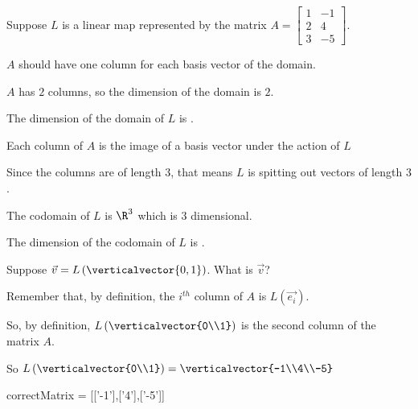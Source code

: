 \documentclass{ximera}
\begin{document}
\begin{question}
  Suppose $L$ is a linear map represented by the matrix
  $A = \begin{bmatrix}
    1&-1\\2&4\\3&-5
  \end{bmatrix}.$
  
  \begin{solution}
  \begin{hint}
  	$A$ should have one column for each basis vector of the domain.
  \end{hint}
  \begin{hint}
  	$A$ has $2$ columns, so the dimension of the domain is $2$.
  \end{hint}
  The dimension of the domain of $L$ is .
  \end{solution}

  \begin{solution}
  	\begin{hint}
  		Each column of $A$ is the image of a basis vector under the action of $L$
  	\end{hint}
  	\begin{hint}
  		Since the columns are of length $3$, that means $L$ is spitting out vectors of length $3$.
  	\end{hint}
  	\begin{hint}
  		The codomain of $L$ is $\R^3$ which is $3$ dimensional.
  	\end{hint}
    The dimension of the codomain of $L$ is .
  \end{solution}
  
  Suppose $\vec{v} = L\left(\verticalvector{0,1}\right)$.  What is $\vec{v}$?
    
  \begin{solution}
  	\begin{hint}
  		Remember that, by definition, the $i^{th}$ column of $A$ is $L(\vec{e_i})$. 
  	\end{hint}
  	\begin{hint}
  		So, by definition, $L\left(\verticalvector{0\\1}\right)$ is the second column of the matrix $A$.
  	\end{hint}
  	\begin{hint}
  		So $L\left(\verticalvector{0\\1}\right) = \verticalvector{-1\\4\\-5}$
  	\end{hint}
    \begin{matrix-answer}[name=v]
      correctMatrix = [['-1'],['4'],['-5']]
    \end{matrix-answer}          
  \end{solution}


\end{question}
\end{document}
